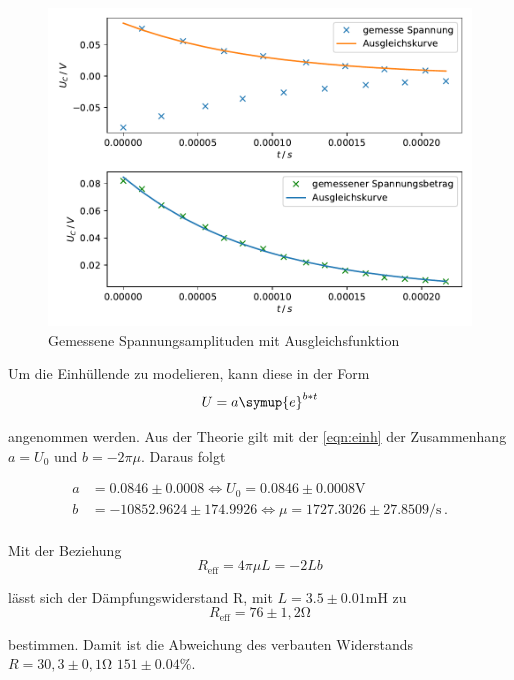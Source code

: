 \newpage
\begin{figure}
    \centering
    \label{fig:1}
    \includegraphics{Daten/a.pdf}
    \caption{Gemessene Spannungsamplituden mit Ausgleichsfunktion}
\end{figure}

Um die Einhüllende zu modelieren, kann diese in der Form
\begin{equation}
    U = a \symup{e}^{b*t}
\end{equation}

\noindent
angenommen werden. Aus der Theorie gilt mit der \autoref{eqn:einh} der Zusammenhang $a = U_0$ und $b = -2 \pi \mu$. Daraus folgt %


\begin{align*}
    a &= 0.0846 \pm 0.0008 \Leftrightarrow U_0 = 0.0846 \pm 0.0008 \si{\volt} \\
    b &= -10852.9624 \pm 174.9926 \Leftrightarrow \mu = 1727.3026 \pm 27.8509 \si{\per\second} \, .\\
\end{align*}

\noindent
Mit der Beziehung 
\begin{equation}
    R_\text{eff} = 4\pi\mu L = -2 L b
\end{equation}

\noindent
lässt sich der Dämpfungswiderstand R, mit $L = 3.5 \pm 0.01 \si{\milli\henry}$ zu
\begin{equation*}
    R_\text{eff} = 76 \pm 1,2 \si{\ohm}
\end{equation*}

\noindent
bestimmen. Damit ist die Abweichung des verbauten Widerstands $R = 30,3 \pm 0,1 \si{\ohm}$ $151 \pm 0.04 \si{\percent}$.

